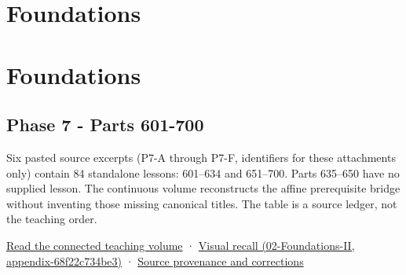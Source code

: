 \hypertarget{appendix-fd090d982a15}{}
\section*{Foundations}
\section{Foundations}\label{foundations}

\subsection{Phase 7 - Parts 601-700}\label{phase-7---parts-601-700}

Six pasted source excerpts (P7-A through P7-F, identifiers for these attachments only) contain 84 standalone lessons: 601--634 and 651--700. Parts 635--650 have no supplied lesson. The continuous volume reconstructs the affine prerequisite bridge without inventing those missing canonical titles. The table is a source ledger, not the teaching order.

\href{Continuous\%20Notes/Computing\%20Foundations\%20-\%20From\%20Bits\%20to\%20C++\%20and\%20Systems\%20APIs\#Keep\%20the\%20promises\%20visible\%20while\%20moving\%20between\%20representations}{Read the connected teaching volume} · \href{}{Visual recall (02-Foundations-II, appendix-68f22c734be3)} · \hyperref[appendix-a103e7846d21]{Source provenance and corrections}

